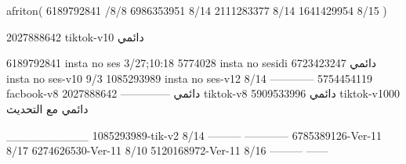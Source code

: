 afriton(
6189792841 /8/8
6986353951 8/14
2111283377 8/14
1641429954 8/15
)

2027888642 tiktok-v10
دائمي

6189792841 insta no ses
3/27;10:18
5774028 insta no sesidi
دائمي
6723423247 insta no ses-v10
9/3
1085293989 insta no ses-v12
8/14
------------
5754454119 facbook-v8
دائمي
--------------
2027888642 tiktok-v8
دائمي
5909533996 tiktok-v1000
دائمي مع التحديث

__________
1085293989-tik-v2
8/14
---------
------------
6785389126-Ver-11
8/17
6274626530-Ver-11
8/10
5120168972-Ver-11
8/16
---------
------
